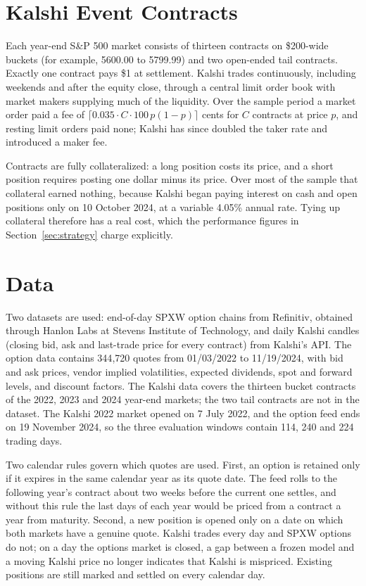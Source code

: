 \documentclass{article}
\begin{document}
\section{Kalshi Event Contracts}\label{sec:kalshi}
Each year-end S\&P 500 market consists of thirteen contracts on \$200-wide buckets (for example, 5600.00 to 5799.99) and two open-ended tail contracts. Exactly one contract pays \$1 at settlement. Kalshi trades continuously, including weekends and after the equity close, through a central limit order book with market makers supplying much of the liquidity. Over the sample period a market order paid a fee of $\lceil 0.035\cdot C\cdot 100\,p(1-p)\rceil$ cents for $C$ contracts at price $p$, and resting limit orders paid none; Kalshi has since doubled the taker rate and introduced a maker fee.

Contracts are fully collateralized: a long position costs its price, and a short position requires posting one dollar minus its price. Over most of the sample that collateral earned nothing, because Kalshi began paying interest on cash and open positions only on 10 October 2024, at a variable 4.05\% annual rate. Tying up collateral therefore has a real cost, which the performance figures in Section~\ref{sec:strategy} charge explicitly.

\section{Data}\label{sec:data}
Two datasets are used: end-of-day SPXW option chains from Refinitiv, obtained through Hanlon Labs at Stevens Institute of Technology, and daily Kalshi candles (closing bid, ask and last-trade price for every contract) from Kalshi's API. The option data contains 344{,}720 quotes from 01/03/2022 to 11/19/2024, with bid and ask prices, vendor implied volatilities, expected dividends, spot and forward levels, and discount factors. The Kalshi data covers the thirteen bucket contracts of the 2022, 2023 and 2024 year-end markets; the two tail contracts are not in the dataset. The Kalshi 2022 market opened on 7 July 2022, and the option feed ends on 19 November 2024, so the three evaluation windows contain 114, 240 and 224 trading days.

Two calendar rules govern which quotes are used. First, an option is retained only if it expires in the same calendar year as its quote date. The feed rolls to the following year's contract about two weeks before the current one settles, and without this rule the last days of each year would be priced from a contract a year from maturity. Second, a new position is opened only on a date on which both markets have a genuine quote. Kalshi trades every day and SPXW options do not; on a day the options market is closed, a gap between a frozen model and a moving Kalshi price no longer indicates that Kalshi is mispriced. Existing positions are still marked and settled on every calendar day.
\end{document}

